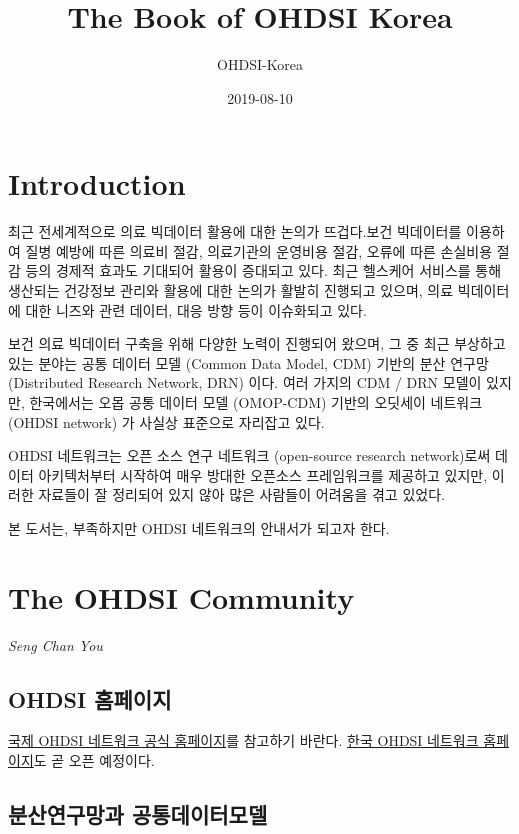 \documentclass[]{book}
\title{The Book of OHDSI Korea}
\author{OHDSI-Korea}
\date{2019-08-10}
\begin{document}
\maketitle

{
\setcounter{tocdepth}{1}
\tableofcontents
}
\hypertarget{introduction}{%
\chapter{Introduction}\label{introduction}}

최근 전세계적으로 의료 빅데이터 활용에 대한 논의가 뜨겁다.보건 빅데이터를 이용하여 질병 예방에 따른 의료비 절감, 의료기관의 운영비용 절감, 오류에 따른 손실비용 절감 등의 경제적 효과도 기대되어 활용이 증대되고 있다. 최근 헬스케어 서비스를 통해 생산되는 건강정보 관리와 활용에 대한 논의가 활발히 진행되고 있으며, 의료 빅데이터에 대한 니즈와 관련 데이터, 대응 방향 등이 이슈화되고 있다.

보건 의료 빅데이터 구축을 위해 다양한 노력이 진행되어 왔으며, 그 중 최근 부상하고 있는 분야는 공통 데이터 모델 (Common Data Model, CDM) 기반의 분산 연구망 (Distributed Research Network, DRN) 이다. 여러 가지의 CDM / DRN 모델이 있지만, 한국에서는 오몹 공통 데이터 모델 (OMOP-CDM) 기반의 오딧세이 네트워크 (OHDSI network) 가 사실상 표준으로 자리잡고 있다.

OHDSI 네트워크는 오픈 소스 연구 네트워크 (open-source research network)로써 데이터 아키텍처부터 시작하여 매우 방대한 오픈소스 프레임워크를 제공하고 있지만, 이러한 자료들이 잘 정리되어 있지 않아 많은 사람들이 어려움을 겪고 있었다.

본 도서는, 부족하지만 OHDSI 네트워크의 안내서가 되고자 한다.

\hypertarget{ohdsiCommunity}{%
\chapter{The OHDSI Community}\label{ohdsiCommunity}}

\emph{Seng Chan You}

\hypertarget{ohdsi-}{%
\section{OHDSI 홈페이지}\label{ohdsi-}}

\href{https://www.ohdsi.org/}{국제 OHDSI 네트워크 공식 홈페이지}를 참고하기 바란다. \href{https://www.ohdsi-korea.org/}{한국 OHDSI 네트워크 홈페이지}도 곧 오픈 예정이다.

\hypertarget{drnCdm}{%
\section{분산연구망과 공통데이터모델}\label{drnCdm}}
\end{document}
